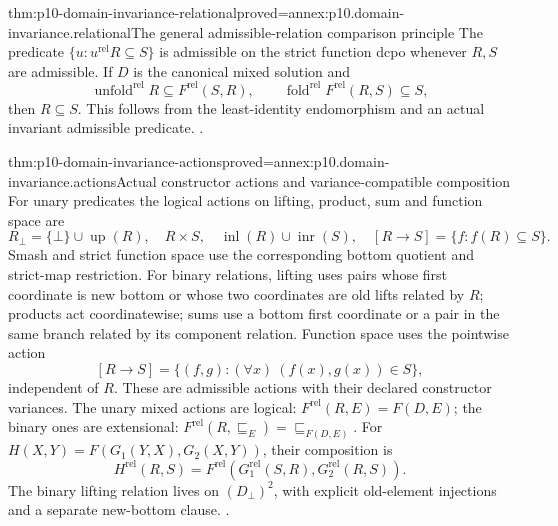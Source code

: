 \begin{hbtheorem}{thm:p10-domain-invariance-relational}{proved=annex:p10.domain-invariance.relational}{The general admissible-relation comparison principle}
The predicate \(\{u:u^{\mathrm{rel}}R\subseteq S\}\) is
admissible on the strict function dcpo whenever \(R,S\) are
admissible. If \(D\) is the canonical mixed solution and
\[
 \operatorname{unfold}^{\mathrm{rel}}R\subseteq F^{\mathrm{rel}}(S,R),
 \qquad
 \operatorname{fold}^{\mathrm{rel}}F^{\mathrm{rel}}(R,S)\subseteq S,
\]
then \(R\subseteq S\). This follows from the least-identity
endomorphism and an actual invariant admissible predicate.
\cite[Proposition~5.4.2; Theorem~5.4.5, pp.~80--81]
{AbramskyJungCorrectedExpandedDomainTheory}.
\end{hbtheorem}

\begin{hbtheorem}{thm:p10-domain-invariance-actions}{proved=annex:p10.domain-invariance.actions}{Actual constructor actions and variance-compatible composition}
For unary predicates the logical actions on lifting, product,
sum and function space are
\[
 R_{\bot}=\{\bot\}\cup\operatorname{up}(R),\quad
 R\times S,\quad\operatorname{inl}(R)\cup\operatorname{inr}(S),
 \quad [R\longrightarrow S]=\{f:f(R)\subseteq S\}.
\]
Smash and strict function space use the corresponding bottom
quotient and strict-map restriction. For binary relations, lifting
uses pairs whose first coordinate is new bottom or whose two
coordinates are old lifts related by \(R\); products act
coordinatewise; sums use a bottom first coordinate or a pair
in the same branch related by its component relation. Function
space uses the pointwise action
\[
 [R\longrightarrow S]=\{(f,g):(\forall x)\ (f(x),g(x))\in S\},
\]
independent of \(R\). These are admissible actions with their
declared constructor variances. The unary mixed actions are
logical: \(F^{\mathrm{rel}}(R,E)=F(D,E)\); the binary ones
are extensional: \(F^{\mathrm{rel}}(R,\sqsubseteq_E)
=\sqsubseteq_{F(D,E)}\). For
\(H(X,Y)=F(G_1(Y,X),G_2(X,Y))\), their composition is
\[
 H^{\mathrm{rel}}(R,S)=
 F^{\mathrm{rel}}(G_1^{\mathrm{rel}}(S,R),G_2^{\mathrm{rel}}(R,S)).
\]
The binary lifting relation lives on \((D_{\bot})^2\), with
explicit old-element injections and a separate new-bottom clause.
\cite[pp.~81--83]{AbramskyJungCorrectedExpandedDomainTheory}.
\end{hbtheorem}

